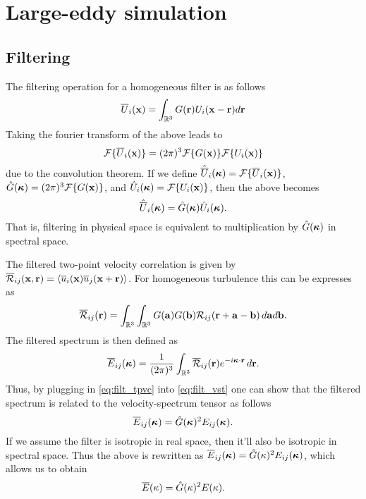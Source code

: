 \documentclass[oneside,a4paper,11pt]{report}
\begin{document}
%
\chapter{Large-eddy simulation}
%

\section{Filtering}
The filtering operation for a homogeneous filter is as follows
\begin{equation}
\overline{U}_i(\mathbf{x}) = \int_{{\mathbb{R}^3}} G(\mathbf{r}) U_i(\mathbf{x} - \mathbf{r} ) d\mathbf{r}
\end{equation}
Taking the fourier transform of the above leads to
\begin{equation}
\mathcal{F}\{ \overline{U}_i(\mathbf{x}) \} = (2 \pi)^3 \mathcal{F} \{ G(\mathbf{x}) \} \mathcal{F} \{ U_i(\mathbf{x}) \}
\end{equation}
due to the convolution theorem. If we define $\hat{\overline{U}}_i (\boldsymbol\kappa) = \mathcal{F}\{ \overline{U}_i(\mathbf{x}) \}$, $\hat{G}(\boldsymbol\kappa) = (2 \pi )^3 \mathcal{F} \{ G(\mathbf{x}) \}$, and $\hat{U}_i(\boldsymbol\kappa) = \mathcal{F} \{ U_i(\mathbf{x}) \}$, then the above becomes
\begin{equation}
\hat{\overline{U}}_i (\boldsymbol\kappa) = \hat{G}(\boldsymbol\kappa) \hat{U}_i(\boldsymbol\kappa).
\end{equation}
That is, filtering in physical space is equivalent to multiplication by $\hat{G}(\boldsymbol\kappa)$ in spectral space.

The filtered two-point velocity correlation is given by $\overline{\mathcal{R}}_{ij}(\mathbf{x}, \mathbf{r}) = \langle \overline{u}_i(\mathbf{x}) \overline{u}_j(\mathbf{x} + \mathbf{r}) \rangle$. For homogeneous turbulence this can be expresses as
\begin{equation}
\label{eq:filt_tpvc}
\overline{\mathcal{R}}_{ij}(\mathbf{r}) = \int_{\mathbb{R}^3} \int_{\mathbb{R}^3} G(\mathbf{a}) G(\mathbf{b}) \mathcal{R}_{ij}(\mathbf{r} + \mathbf{a} - \mathbf{b}) \, d\mathbf{a} d\mathbf{b}.
\end{equation}
The filtered spectrum is then defined as
\begin{equation}
\label{eq:filt_vst}
\overline{E}_{ij}(\boldsymbol\kappa) = \frac{1}{ (2\pi)^3 } \int_{\mathbb{R}^3} \overline{\mathcal{R}}_{ij} (\mathbf{r}) e^{-i \boldsymbol\kappa \cdot \mathbf{r}} \, d\mathbf{r}.
\end{equation}
Thus, by plugging in \cref{eq:filt_tpvc} into \cref{eq:filt_vst} one can show that the filtered spectrum is related to the velocity-spectrum tensor as follows
\begin{equation}
\overline{E}_{ij} (\boldsymbol\kappa) = \hat{G}(\boldsymbol\kappa)^2 E_{ij}(\boldsymbol\kappa).
\end{equation}
If we assume the filter is isotropic in real space, then it'll also be isotropic in spectral space. Thus the above is rewritten as $\overline{E}_{ij} (\boldsymbol\kappa) = \hat{G}( \kappa )^2 E_{ij}(\boldsymbol\kappa)$, which allows us to obtain
\begin{equation}
\overline{E}(\kappa) = \hat{G}(\kappa)^2 E(\kappa).
\end{equation}
\end{document}
